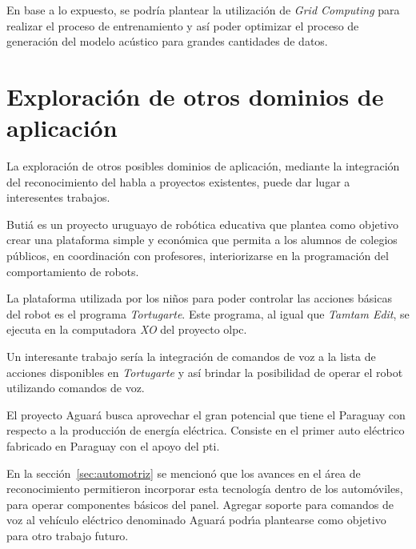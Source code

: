 En base a lo expuesto, se podr\'ia plantear la utilizaci\'on de \emph{Grid Computing} para realizar el 
proceso de entrenamiento y as\'i poder optimizar el proceso de generaci\'on del modelo ac\'ustico 
para grandes cantidades de datos.

\section{Exploraci\'on de otros dominios de aplicaci\'on}
La exploraci\'on de otros posibles dominios de aplicaci\'on, mediante la integraci\'on del reconocimiento 
del habla a proyectos existentes, puede dar lugar a interesentes trabajos.

Buti\'a es un proyecto uruguayo de rob\'otica educativa \cite{RoboticaEducativa} que plantea como objetivo 
crear una plataforma simple y econ\'omica que permita a los alumnos de colegios p\'ublicos,
en coordinaci\'on con profesores, interiorizarse en la programaci\'on del comportamiento de 
robots\cite{Butia}.

La plataforma utilizada por los ni\~nos para poder controlar las acciones b\'asicas del robot es el 
programa \emph{Tortugarte}. Este programa, al igual que \emph{Tamtam Edit}, se ejecuta en la computadora 
\emph{XO} del proyecto \gls{olpc}.

Un interesante trabajo ser\'ia la integraci\'on de comandos de voz a la lista de acciones disponibles 
en \emph{Tortugarte} y as\'i brindar la posibilidad de operar el robot utilizando comandos de voz.

El proyecto Aguar\'a busca aprovechar el gran potencial que tiene el Paraguay con respecto a la 
producci\'on de energ\'ia el\'ectrica. Consiste en el primer auto el\'ectrico fabricado en Paraguay 
con el apoyo del \gls{pti}. 

En la secci\'on~\ref{sec:automotriz} se mencion\'o que los avances en el \'area de reconocimiento
permitieron incorporar esta tecnolog\'ia dentro de los autom\'oviles, para operar componentes b\'asicos 
del panel.
Agregar soporte para comandos de voz al veh\'iculo el\'ectrico denominado Aguar\'a podr{\'\i}a plantearse 
como objetivo para otro trabajo futuro.
